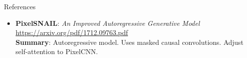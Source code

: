 \documentclass{beamer}
\begin{document}
\begin{frame}{References}
{\begin{itemize}
	\item \textbf{PixelSNAIL}: \textit{An Improved Autoregressive Generative Model} \\
	\href{https://arxiv.org/pdf/1712.09763.pdf}{https://arxiv.org/pdf/1712.09763.pdf} \\
	\textbf{Summary}: Autoregressive model. Uses masked causal convolutions. Adjust self-attention to PixelCNN.
\end{itemize}
}
\end{frame}
\end{document}
